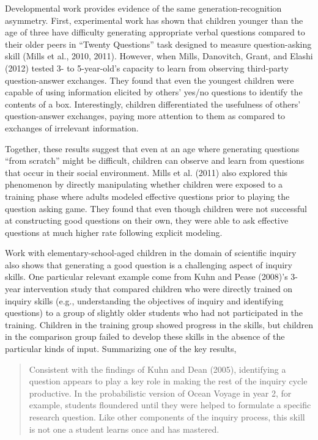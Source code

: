 \documentclass[english,man]{apa6}
\theoremstyle{definition}
\theoremstyle{definition}
\theoremstyle{definition}
\theoremstyle{remark}
\begin{document}
Developmental work provides evidence of the same generation-recognition
asymmetry. First, experimental work has shown that children younger than
the age of three have difficulty generating appropriate verbal questions
compared to their older peers in \enquote{Twenty Questions} task
designed to measure question-asking skill (Mills et al., 2010, 2011).
However, when Mills, Danovitch, Grant, and Elashi (2012) tested 3- to
5-year-old's capacity to learn from observing third-party
question-answer exchanges. They found that even the youngest children
were capable of using information elicited by others' yes/no questions
to identify the contents of a box. Interestingly, children
differentiated the usefulness of others' question-answer exchanges,
paying more attention to them as compared to exchanges of irrelevant
information.

Together, these results suggest that even at an age where generating
questions \enquote{from scratch} might be difficult, children can
observe and learn from questions that occur in their social environment.
Mills et al. (2011) also explored this phenomenon by directly
manipulating whether children were exposed to a training phase where
adults modeled effective questions prior to playing the question asking
game. They found that even though children were not successful at
constructing good questions on their own, they were able to ask
effective questions at much higher rate following explicit modeling.

Work with elementary-school-aged children in the domain of scientific
inquiry also shows that generating a good question is a challenging
aspect of inquiry skills. One particular relevant example come from Kuhn
and Pease (2008)'s 3-year intervention study that compared children who
were directly trained on inquiry skills (e.g., understanding the
objectives of inquiry and identifying questions) to a group of slightly
older students who had not participated in the training. Children in the
training group showed progress in the skills, but children in the
comparison group failed to develop these skills in the absence of the
particular kinds of input. Summarizing one of the key results,

\begin{quote}
Consistent with the findings of Kuhn and Dean (2005), identifying a
question appears to play a key role in making the rest of the inquiry
cycle productive. In the probabilistic version of Ocean Voyage in year
2, for example, students floundered until they were helped to formulate
a specific research question. Like other components of the inquiry
process, this skill is not one a student learns once and has mastered.
\end{quote}
\end{document}
